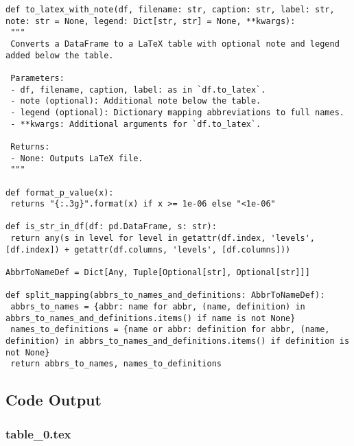 \documentclass[11pt]{article}
\begin{document}
\begin{verbatim}
def to_latex_with_note(df, filename: str, caption: str, label: str, note: str = None, legend: Dict[str, str] = None, **kwargs):
 """
 Converts a DataFrame to a LaTeX table with optional note and legend added below the table.

 Parameters:
 - df, filename, caption, label: as in `df.to_latex`.
 - note (optional): Additional note below the table.
 - legend (optional): Dictionary mapping abbreviations to full names.
 - **kwargs: Additional arguments for `df.to_latex`.

 Returns:
 - None: Outputs LaTeX file.
 """

def format_p_value(x):
 returns "{:.3g}".format(x) if x >= 1e-06 else "<1e-06"

def is_str_in_df(df: pd.DataFrame, s: str):
 return any(s in level for level in getattr(df.index, 'levels', [df.index]) + getattr(df.columns, 'levels', [df.columns]))

AbbrToNameDef = Dict[Any, Tuple[Optional[str], Optional[str]]]

def split_mapping(abbrs_to_names_and_definitions: AbbrToNameDef):
 abbrs_to_names = {abbr: name for abbr, (name, definition) in abbrs_to_names_and_definitions.items() if name is not None}
 names_to_definitions = {name or abbr: definition for abbr, (name, definition) in abbrs_to_names_and_definitions.items() if definition is not None}
 return abbrs_to_names, names_to_definitions

\end{verbatim}



\subsection{Code Output}

\subsubsection*{table\_0.tex}
\end{document}
